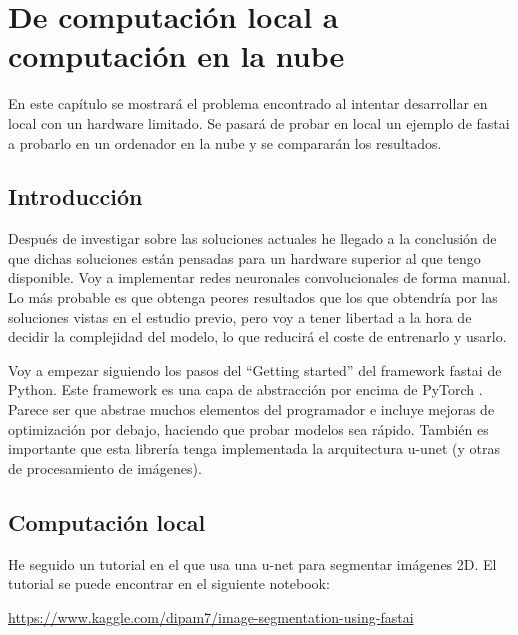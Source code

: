 \chapter{De computación local a computación en la nube}\label{cloudcomputing}

En este capítulo se mostrará el problema encontrado al intentar desarrollar en local con un hardware limitado. Se pasará de probar en local un ejemplo de fastai a probarlo en un ordenador en la nube y se compararán los resultados.

\section{Introducci\'on}\label{sec:intro_cloudcomputing}

Después de investigar sobre las soluciones actuales he llegado a la conclusión de que dichas soluciones están pensadas para un hardware superior al que tengo disponible. Voy a implementar redes neuronales convolucionales de forma manual. Lo más probable es que obtenga peores resultados que los que obtendría por las soluciones vistas en el estudio previo, pero voy a tener libertad a la hora de decidir la complejidad del modelo, lo que reducirá el coste de entrenarlo y usarlo. 

Voy a empezar siguiendo los pasos del “Getting started” del framework fastai \cite{Howard2018} de Python. Este framework es una capa de abstracción por encima de PyTorch \cite{Paszke2019}. Parece ser que abstrae muchos elementos del programador e incluye mejoras de optimización por debajo, haciendo que probar modelos sea rápido. También es importante que esta librería tenga implementada la arquitectura u-unet (y otras de procesamiento de imágenes).

\section{Computación local}\label{sec:local_dev}

He seguido un tutorial en el que usa una u-net para segmentar imágenes 2D. El tutorial se puede encontrar en el siguiente notebook:

\url{https://www.kaggle.com/dipam7/image-segmentation-using-fastai}

